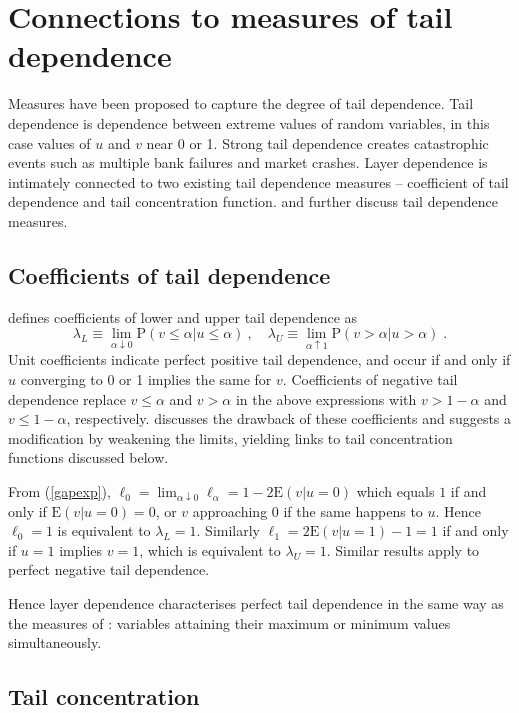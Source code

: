 \documentclass[authoryear]{elsarticle}
\newcommand{\E}{{\mathrm E}}
\newcommand{\p}{\mathrm{P}}
\newcommand{\cq}{\ ,\quad }
\newcommand{\eref}[1]{(\ref{#1})}
\begin{document}
\section{Connections to measures of tail dependence}\label{sliterature}

Measures have been proposed to capture the degree of tail dependence. Tail dependence is dependence between extreme values of random variables, in this case values of $u$ and $v$ near 0 or 1. Strong tail dependence creates catastrophic events such as  multiple bank failures and  market crashes. Layer dependence is intimately connected to two existing tail dependence measures -- coefficient of tail dependence and tail concentration function. \cite{sweeting2013calculating} and \cite{durante2014copulas} further discuss tail dependence measures.


\subsection{Coefficients of tail dependence}

\cite{joe1997multivariate} defines coefficients of lower and upper tail dependence as
$$
\lambda_L \equiv \lim_{\alpha\downarrow 0} \p(v\leq \alpha |u\leq \alpha) \cq
\lambda_U \equiv \lim_{\alpha\uparrow 1} \p(v>\alpha |u>\alpha) \;.
$$
Unit coefficients indicate perfect positive tail dependence, and occur if and only if $u$ converging to 0 or 1 implies the same for $v$. Coefficients of negative tail dependence replace $v\leq \alpha$ and $v>\alpha$ in the above expressions with $v>1-\alpha$ and $v\leq 1-\alpha$, respectively.  \cite{sweeting2013calculating} discusses the drawback of these coefficients and suggests a modification by weakening the limits, yielding links to tail concentration functions discussed below.

From \eref{gapexp}, $\ell_0=\lim_{\alpha\downarrow 0} \ell_\alpha=1-2\E(v|u=0)$ which equals $1$ if and only if $\E(v|u=0)=0$, or $v$ approaching 0 if the same happens to $u$. Hence $\ell_0=1$ is equivalent to $\lambda_L=1$. Similarly $\ell_1=2\E(v|u=1)-1=1$ if and only if $u=1$ implies $v=1$, which is equivalent to $\lambda_U=1$. Similar results apply to perfect negative tail dependence.

Hence layer dependence characterises perfect tail dependence in the same way as the measures of  \cite{joe1997multivariate}: variables attaining their maximum or minimum values simultaneously.



\subsection{Tail concentration}
\end{document}
